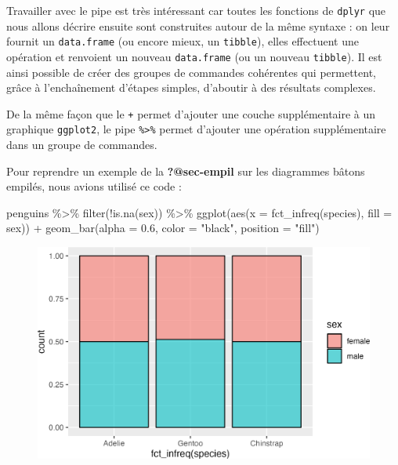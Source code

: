 \documentclass[
  letterpaper,
  DIV=11,
  numbers=noendperiod]{scrreprt}
\newenvironment{Shaded}{\begin{snugshade}}{\end{snugshade}}
\newcommand{\AttributeTok}[1]{\textcolor[rgb]{0.40,0.45,0.13}{#1}}
\newcommand{\FloatTok}[1]{\textcolor[rgb]{0.68,0.00,0.00}{#1}}
\newcommand{\FunctionTok}[1]{\textcolor[rgb]{0.28,0.35,0.67}{#1}}
\newcommand{\NormalTok}[1]{\textcolor[rgb]{0.00,0.23,0.31}{#1}}
\newcommand{\SpecialCharTok}[1]{\textcolor[rgb]{0.37,0.37,0.37}{#1}}
\newcommand{\StringTok}[1]{\textcolor[rgb]{0.13,0.47,0.30}{#1}}
\begin{document}
Travailler avec le pipe est très intéressant car toutes les fonctions de
\texttt{dplyr} que nous allons décrire ensuite sont construites autour
de la même syntaxe : on leur fournit un \texttt{data.frame} (ou encore
mieux, un \texttt{tibble}), elles effectuent une opération et renvoient
un nouveau \texttt{data.frame} (ou un nouveau \texttt{tibble}). Il est
ainsi possible de créer des groupes de commandes cohérentes qui
permettent, grâce à l'enchaînement d'étapes simples, d'aboutir à des
résultats complexes.

De la même façon que le \texttt{+} permet d'ajouter une couche
supplémentaire à un graphique \texttt{ggplot2}, le pipe
\texttt{\%\textgreater{}\%} permet d'ajouter une opération
supplémentaire dans un groupe de commandes.

Pour reprendre un exemple de la \textbf{?@sec-empil} sur les diagrammes
bâtons empilés, nous avions utilisé ce code :

\begin{Shaded}
\begin{Highlighting}[]
\NormalTok{penguins }\SpecialCharTok{\%\textgreater{}\%} 
  \FunctionTok{filter}\NormalTok{(}\SpecialCharTok{!}\FunctionTok{is.na}\NormalTok{(sex)) }\SpecialCharTok{\%\textgreater{}\%} 
  \FunctionTok{ggplot}\NormalTok{(}\FunctionTok{aes}\NormalTok{(}\AttributeTok{x =} \FunctionTok{fct\_infreq}\NormalTok{(species), }\AttributeTok{fill =}\NormalTok{ sex)) }\SpecialCharTok{+}
  \FunctionTok{geom\_bar}\NormalTok{(}\AttributeTok{alpha =} \FloatTok{0.6}\NormalTok{, }\AttributeTok{color =} \StringTok{"black"}\NormalTok{, }\AttributeTok{position =} \StringTok{"fill"}\NormalTok{)}
\end{Highlighting}
\end{Shaded}

\begin{figure}[H]

{\centering \includegraphics{./04-DataWrangling_files/figure-pdf/unnamed-chunk-12-1.png}

}

\end{figure}
\end{document}
